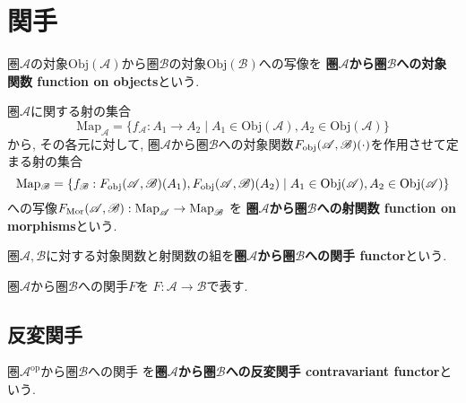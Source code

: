 \section{関手}
\begin{Def}
圏$\mathscr{A}$の対象$\mathrm{Obj}(\mathscr{A})$から圏$\mathscr{B}$の対象$\mathrm{Obj}(\mathscr{B})$への写像を
{\bf 圏$\mathscr{A}$から圏$\mathscr{B}$への対象関数 function on objects}という.
\end{Def}
\begin{Def}
圏$\mathscr{A}$に関する射の集合\[\mathrm{Map}_{\mathscr{A}}=\{f_{\mathscr{A}}:A_1\rightarrow A_2\mid A_1\in\mathrm{Obj}(\mathscr{A}),A_2\in\mathrm{Obj}(\mathscr{A})\}\]
から, その各元に対して, 
圏$\mathscr{A}$から圏$\mathscr{B}$への対象関数$F_{\rm obj}(\mathscr{A},\mathscr{B})(\cdot)$を作用させて定まる射の集合
\[
\mathrm{Map_\mathscr{B}}=\{f_{\mathscr{B}}:F_{\rm obj}(\mathscr{A},\mathscr{B})(A_1),
F_{\rm obj}(\mathscr{A},\mathscr{B})(A_2)\mid A_1\in\mathrm{Obj}(\mathscr{A}),A_2\in\mathrm{Obj}(\mathscr{A})\}
\]
への写像$F_{\rm Mor}(\mathscr{A},\mathscr{B}):\mathrm{Map}_{\mathscr{A}}\rightarrow\mathrm{Map}_{\mathscr{B}}$
を
{\bf 圏$\mathscr{A}$から圏$\mathscr{B}$への射関数 function on morphisms}という.
\end{Def}
\begin{Def}
圏$\mathscr{A},\mathscr{B}$に対する対象関数と射関数の組を{\bf 圏$\mathscr{A}$から圏$\mathscr{B}$への関手 functor}という.
\end{Def}
\begin{Notation}
圏$\mathscr{A}$から圏$\mathscr{B}$への関手$F$を
$F:\mathscr{A}\rightarrow\mathscr{B}$で表す.
\end{Notation}
\begin{comment}
\begin{example}
順序を保存する写像
\end{example}
\end{comment}
\begin{comment}
\begin{example}
圏と見做した順序集合間の簡単な関手の例
\end{example}
\end{comment}
\begin{comment}
*************************
\begin{example}
$n$次ホモロジー関手
\end{example}
***************************
\end{comment}

\subsection{反変関手}
\begin{Def}
圏$\mathscr{A}^{\mathrm{op}}$から圏$\mathscr{B}$への関手
を{\bf 圏$\mathscr{A}$から圏$\mathscr{B}$への反変関手 contravariant functor}という.
\end{Def}
